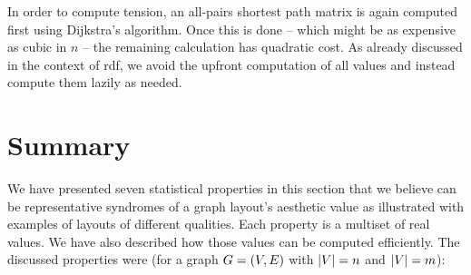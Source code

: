 \documentclass{graphstudy}
\begin{document}
In order to compute tension, an all-pairs shortest path matrix is again computed first using Dijkstra's algorithm.  Once
this is done -- which might be as expensive as cubic in \(n\) -- the remaining calculation has quadratic cost.  As
already discussed in the context of \ac{rdf}, we avoid the upfront computation of all values and instead compute them
lazily as needed.

\section{Summary}

We have presented seven statistical properties in this section that we believe can be representative syndromes of a
graph layout's aesthetic value as illustrated with examples of layouts of different qualities.  Each property is a
multiset of real values.  We have also described how those values can be computed efficiently.  The discussed properties
were (for a graph \(G=(V,E)\) with \(\left\lvert V\right\rvert=n\) and \(\left\lvert V\right\rvert=m\)):
\end{document}
